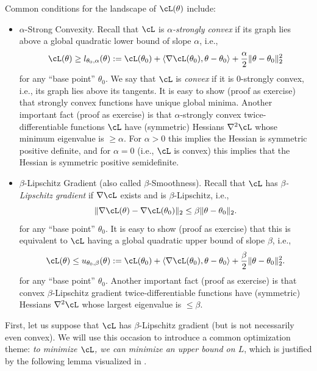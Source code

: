 \documentclass[../../book-main.tex]{subfiles}
\begin{document}
Common conditions for the landscape of \(\cL(\theta)\) include:
\begin{itemize}
    \item \(\alpha\)-Strong Convexity. Recall that \(\cL\) is \textit{\(\alpha\)-strongly convex} if its graph lies above a global quadratic lower bound of slope \(\alpha\), i.e.,
    \begin{equation}
        \cL(\theta) \geq l_{\theta_{0}, \alpha}(\theta) := \cL(\theta_{0}) + \ip{\nabla \cL(\theta_{0})}{\theta - \theta_{0}} + \frac{\alpha}{2}\norm{\theta - \theta_{0}}_{2}^{2}
    \end{equation}
    for any ``base point'' \(\theta_{0}\). We say that \(\cL\) is \textit{convex} if it is \(0\)-strongly convex, i.e., its graph lies above its tangents. It is easy to show (proof as exercise) that strongly convex functions have unique global minima. Another important fact (proof as exercise) is that \(\alpha\)-strongly convex twice-differentiable functions \(\cL\) have (symmetric) Hessians \(\nabla^{2}\cL\) whose minimum eigenvalue is \(\geq \alpha\). For \(\alpha > 0\) this implies the Hessian is symmetric positive definite, and for \(\alpha = 0\) (i.e., \(\cL\) is convex) this implies that the Hessian is symmetric positive semidefinite.
    \item \(\beta\)-Lipschitz Gradient (also called \(\beta\)-Smoothness). Recall that \(\cL\) has \textit{\(\beta\)-Lipschitz gradient} if \(\nabla \cL\) exists and is \(\beta\)-Lipschitz, i.e.,
    \begin{equation}
        \norm{\nabla \cL(\theta) - \nabla \cL(\theta_{0})}_{2} \leq \beta \norm{\theta - \theta_{0}}_{2}.
    \end{equation}
    for any ``base point'' \(\theta_{0}\).  It is easy to show (proof as exercise) that this is equivalent to \(\cL\) having a global quadratic upper bound of slope \(\beta\), i.e.,
    \begin{equation}
        \cL(\theta) \leq u_{\theta_{0}, \beta}(\theta) := \cL(\theta_{0}) + \ip{\nabla \cL(\theta_{0})}{\theta - \theta_{0}} + \frac{\beta}{2}\norm{\theta - \theta_{0}}_{2}^{2}.
    \end{equation}
    for any ``base point'' \(\theta_{0}\).  Another important fact (proof as exercise) is that convex \(\beta\)-Lipschitz gradient twice-differentiable functions have (symmetric) Hessians \(\nabla^{2}\cL\) whose largest eigenvalue is \(\leq \beta\).
\end{itemize}
First, let us suppose that \(\cL\) has \(\beta\)-Lipschitz gradient (but is not necessarily even convex). We will use this occasion to introduce a common optimization theme: \textit{to minimize \(\cL\), we can minimize an upper bound on \(L\)}, which is justified by the following lemma visualized in .
\end{document}
